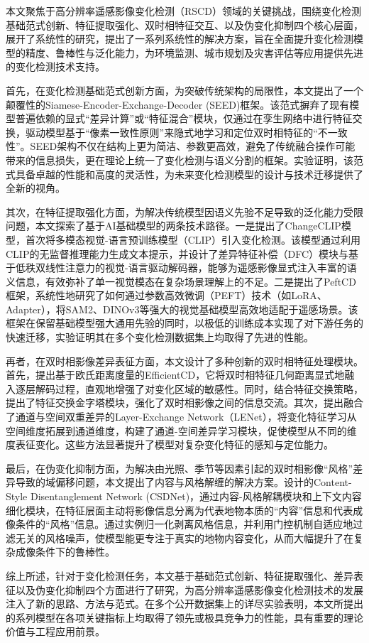 本文聚焦于高分辨率遥感影像变化检测（RSCD）领域的关键挑战，围绕变化检测基础范式创新、特征提取强化、双时相特征交互、以及伪变化抑制四个核心层面，展开了系统性的研究，提出了一系列系统性的解决方案，旨在全面提升变化检测模型的精度、鲁棒性与泛化能力，为环境监测、城市规划及灾害评估等应用提供先进的变化检测技术支持。

首先，在变化检测基础范式创新方面，为突破传统架构的局限性，本文提出了一个颠覆性的Siamese-Encoder-Exchange-Decoder (SEED)框架。该范式摒弃了现有模型普遍依赖的显式“差异计算”或“特征混合”模块，仅通过在孪生网络中进行特征交换，驱动模型基于“像素一致性原则”来隐式地学习和定位双时相特征的“不一致性”。SEED架构不仅在结构上更为简洁、参数更高效，避免了传统融合操作可能带来的信息损失，更在理论上统一了变化检测与语义分割的框架。实验证明，该范式具备卓越的性能和高度的灵活性，为未来变化检测模型的设计与技术迁移提供了全新的视角。

其次，在特征提取强化方面，为解决传统模型因语义先验不足导致的泛化能力受限问题，本文探索了基于AI基础模型的两条技术路径。一是提出了ChangeCLIP模型，首次将多模态视觉-语言预训练模型（CLIP）引入变化检测。该模型通过利用CLIP的无监督推理能力生成文本提示，并设计了差异特征补偿（DFC）模块与基于低秩双线性注意力的视觉-语言驱动解码器，能够为遥感影像显式注入丰富的语义信息，有效弥补了单一视觉模态在复杂场景理解上的不足。二是提出了PeftCD框架，系统性地研究了如何通过参数高效微调（PEFT）技术（如LoRA、Adapter），将SAM2、DINOv3等强大的视觉基础模型高效地适配于遥感场景。该框架在保留基础模型强大通用先验的同时，以极低的训练成本实现了对下游任务的快速迁移，实验证明其在多个变化检测数据集上均取得了先进的性能。

再者，在双时相影像差异表征方面，本文设计了多种创新的双时相特征处理模块。首先，提出基于欧氏距离度量的EfficientCD，它将双时相特征几何距离显式地融入逐层解码过程，直观地增强了对变化区域的敏感性。同时，结合特征交换策略，提出了特征交换金字塔模块，强化了双时相影像之间的信息交流。其次，提出融合了通道与空间双重差异的Layer-Exchange Network（LENet），将变化特征学习从空间维度拓展到通道维度，构建了通道-空间差异学习模块，促使模型从不同的维度表征变化。这些方法显著提升了模型对复杂变化特征的感知与定位能力。

最后，在伪变化抑制方面，为解决由光照、季节等因素引起的双时相影像“风格”差异导致的域偏移问题，本文提出了内容与风格解缠的解决方案。设计的Content-Style Disentanglement Network (CSDNet)，通过内容-风格解耦模块和上下文内容细化模块，在特征层面主动将影像信息分离为代表地物本质的“内容”信息和代表成像条件的“风格”信息。通过实例归一化剥离风格信息，并利用门控机制自适应地过滤无关的风格噪声，使模型能更专注于真实的地物内容变化，从而大幅提升了在复杂成像条件下的鲁棒性。

综上所述，针对于变化检测任务，本文基于基础范式创新、特征提取强化、差异表征以及伪变化抑制四个方面进行了研究，为高分辨率遥感影像变化检测技术的发展注入了新的思路、方法与范式。在多个公开数据集上的详尽实验表明，本文所提出的系列模型在各项关键指标上均取得了领先或极具竞争力的性能，具有重要的理论价值与工程应用前景。

